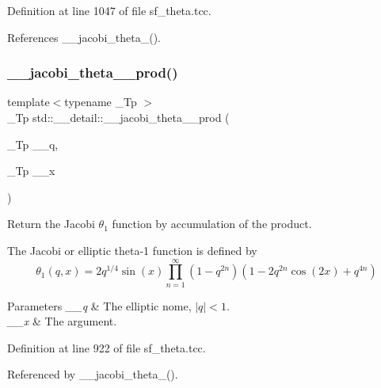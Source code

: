 Definition at line 1047 of file sf\+\_\+theta.\+tcc.



References \+\_\+\+\_\+jacobi\+\_\+theta\+\_().

\mbox{\label{namespacestd_1_1____detail_a6283a61803d2bc02eebf1d1a12b1bb52}} 
\subsubsection{\texorpdfstring{\+\_\+\+\_\+jacobi\+\_\+theta\+\_\+\_\+prod()}{\_\_jacobi\_theta\_1\_prod()}}
{\footnotesize\ttfamily template$<$typename \+\_\+\+Tp $>$ \\
\+\_\+\+Tp std\+::\+\_\+\+\_\+detail\+::\+\_\+\+\_\+jacobi\+\_\+theta\+\_\+\_\+prod (\begin{DoxyParamCaption}\item[{\+\_\+\+Tp}]{\+\_\+\+\_\+q,  }\item[{\+\_\+\+Tp}]{\+\_\+\+\_\+x }\end{DoxyParamCaption})}

Return the Jacobi $ \theta_1 $ function by accumulation of the product.

The Jacobi or elliptic theta-\/1 function is defined by \[ \theta_1(q,x) = 2 q^{1/4} \sin(x) \prod_{n=1}^{\infty} (1 - q^{2n})(1 - 2q^{2n}\cos(2x) + q^{4n}) \]


\begin{DoxyParams}{Parameters}
{\em \+\_\+\+\_\+q} & The elliptic nome, $ |q| < 1 $. \\
\hline
{\em \+\_\+\+\_\+x} & The argument. \\
\hline
\end{DoxyParams}


Definition at line 922 of file sf\+\_\+theta.\+tcc.



Referenced by \+\_\+\+\_\+jacobi\+\_\+theta\+\_().

\mbox{\label{namespacestd_1_1____detail_adea964551a6650baebe13574d942bf50}} 
